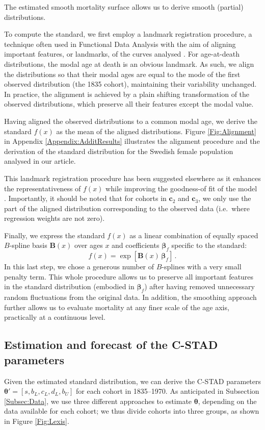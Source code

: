 \documentclass[11pt, a4paper]{article}
\begin{document}
The estimated smooth mortality surface allows us to derive smooth (partial) distributions. {\color{red}To compute the standard, we first employ a landmark registration procedure, a technique often used in Functional Data Analysis with the aim of aligning important features, or landmarks, of the curves analysed \citep{ramsay2005FDA}. For age-at-death distributions, the modal age at death is an obvious landmark. As such, we align the distributions so that their modal ages are equal to the mode of the first observed distribution (the 1835 cohort), maintaining their variability unchanged. In practice, the alignment is achieved by a plain shifting transformation of the observed distributions, which preserve all their features except the modal value. 

Having aligned the observed distributions to a common modal age, we derive the standard $f(x)$ as the mean of the aligned distributions. Figure \ref{Fig:Alignment} in Appendix \ref{Appendix:AdditResults} illustrates the alignment procedure and the derivation of the standard distribution for the Swedish female population analysed in our article.} This landmark registration procedure has been suggested elsewhere as it enhances the representativeness of $f(x)$ while improving the goodness-of fit of the model \cite[for additional details, see][]{basellini2019modelling}. Importantly, it should be noted that for cohorts in $\bm{c}_2$ and $\bm{c}_3$, we only use the part of the aligned distribution corresponding  to the observed data (i.e.~where regression weights are not zero). 

Finally, we express the standard $f(x)$ as a linear combination of equally spaced $B$-spline basis $\bm{B}(x)$ over ages $x$ and coefficients $\bm{\beta}_{f}$ specific to the standard:
%
\begin{equation}\label{Eq:standPsplines}
f(x) = \exp\left[ \bm{B}(x) \, \bm{\beta}_{f} \right] \, .
\end{equation}
In this last step, we chose a generous number of $B$-splines with a {\color{red}very small} penalty term. This whole procedure allows us to preserve all important features in the standard distribution (embodied in $\bm{\beta}_{f}$) after having removed unnecessary random fluctuations from the original data. {\color{red}In addition, the smoothing approach further allows us to evaluate mortality at any finer scale of the age axis, practically at a continuous level.}


\subsection{Estimation and forecast of the C-STAD parameters}
\label{Subsec:EstimForeC-STAD}
Given the estimated standard distribution, we can derive the C-STAD parameters $\bm{\theta}'=\left[s,b_{L},c_{L},d_{L},b_{U}\right]$ for each cohort in 1835--1970. As anticipated in Subsection \ref{Subsec:Data}, we use three different approaches to estimate $\bm{\theta}$, depending on the data available for each cohort; we thus divide cohorts into three groups, as shown in Figure \ref{Fig:Lexis}. 
\end{document}
